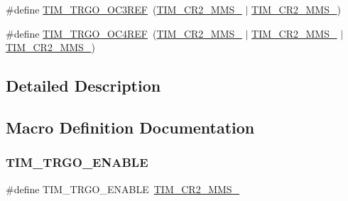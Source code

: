 \begin{DoxyCompactItemize}
\item 
\#define \hyperlink{group___t_i_m___master___mode___selection_ga4bc4791f8b9560950d30078b96d08f55}{T\+I\+M\+\_\+\+T\+R\+G\+O\+\_\+\+O\+C3\+R\+EF}~(\hyperlink{group___peripheral___registers___bits___definition_gacb74a815afdd856d51cfcf1ddf3fce6a}{T\+I\+M\+\_\+\+C\+R2\+\_\+\+M\+M\+S\+\_} $\vert$ \hyperlink{group___peripheral___registers___bits___definition_ga4b1036929b0a4ba5bd5cced9b8e0f4c3}{T\+I\+M\+\_\+\+C\+R2\+\_\+\+M\+M\+S\+\_})
\item 
\#define \hyperlink{group___t_i_m___master___mode___selection_ga7fe6228adec5d1b6f0a8ed8da111db4d}{T\+I\+M\+\_\+\+T\+R\+G\+O\+\_\+\+O\+C4\+R\+EF}~(\hyperlink{group___peripheral___registers___bits___definition_gacb74a815afdd856d51cfcf1ddf3fce6a}{T\+I\+M\+\_\+\+C\+R2\+\_\+\+M\+M\+S\+\_} $\vert$ \hyperlink{group___peripheral___registers___bits___definition_ga4b1036929b0a4ba5bd5cced9b8e0f4c3}{T\+I\+M\+\_\+\+C\+R2\+\_\+\+M\+M\+S\+\_} $\vert$ \hyperlink{group___peripheral___registers___bits___definition_gaf3e55308e84106d6501201e66bd46ab6}{T\+I\+M\+\_\+\+C\+R2\+\_\+\+M\+M\+S\+\_})
\end{DoxyCompactItemize}


\subsection{Detailed Description}


\subsection{Macro Definition Documentation}
\mbox{\label{group___t_i_m___master___mode___selection_ga4ac300b0fd24d1e6532e5961680a39a9}} 
\subsubsection{\texorpdfstring{T\+I\+M\+\_\+\+T\+R\+G\+O\+\_\+\+E\+N\+A\+B\+LE}{TIM\_TRGO\_ENABLE}}
{\footnotesize\ttfamily \#define T\+I\+M\+\_\+\+T\+R\+G\+O\+\_\+\+E\+N\+A\+B\+LE~\hyperlink{group___peripheral___registers___bits___definition_gaf3e55308e84106d6501201e66bd46ab6}{T\+I\+M\+\_\+\+C\+R2\+\_\+\+M\+M\+S\+\_}}

